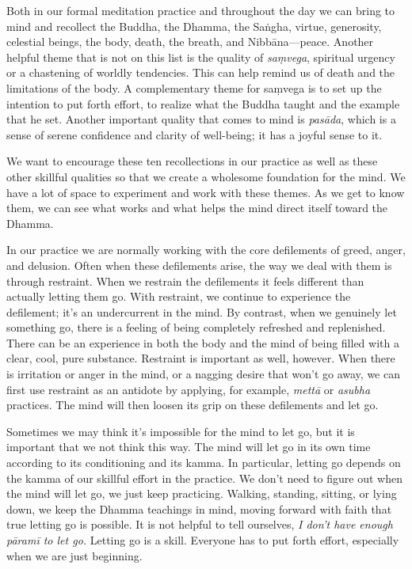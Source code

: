 Both in our formal meditation practice and throughout the day we can 
bring to mind and recollect the Buddha, the Dhamma, the Saṅgha, 
virtue, generosity, celestial beings, the body, death, the breath, and 
Nibbāna---peace. Another helpful theme that is not on this list is the 
quality of \emph{saṃvega}, spiritual urgency or a chastening of 
worldly tendencies. This can help remind us of death and the 
limitations of the body. A complementary theme for saṃvega is to set 
up the intention to put forth effort, to realize what the Buddha taught 
and the example that he set. Another important quality that comes to 
mind is \emph{pasāda}, which is a sense of serene confidence and 
clarity of well-being; it has a joyful sense to it.

We want to encourage these ten recollections in our practice as well as 
these other skillful qualities so that we create a wholesome foundation 
for the mind. We have a lot of space to experiment and work with these 
themes. As we get to know them, we can see what works and what helps 
the mind direct itself toward the Dhamma.


In our practice we are normally working with the core defilements of 
greed, anger, and delusion. Often when these defilements arise, the way 
we deal with them is through restraint. When we restrain the 
defilements it feels different than actually letting them go. With 
restraint, we continue to experience the defilement; it's an 
undercurrent in the mind. By contrast, when we genuinely let something 
go, there is a feeling of being completely refreshed and replenished. 
There can be an experience in both the body and the mind of being 
filled with a clear, cool, pure substance. Restraint is important as 
well, however. When there is irritation or anger in the mind, or a 
nagging desire that won't go away, we can first use restraint as an 
antidote by applying, for example, \emph{mettā} or \emph{asubha} 
practices. The mind will then loosen its grip on these defilements and 
let go.

Sometimes we may think it's impossible for the mind to let go, but it 
is important that we not think this way. The mind will let go in its 
own time according to its conditioning and its kamma. In particular, 
letting go depends on the kamma of our skillful effort in the practice. 
We don't need to figure out when the mind will let go, we just keep 
practicing. Walking, standing, sitting, or lying down, we keep the 
Dhamma teachings in mind, moving forward with faith that true letting 
go is possible. It is not helpful to tell ourselves, \emph{I don't have 
enough pāramī to let go.} Letting go is a skill. Everyone has to put 
forth effort, especially when we are just beginning.

